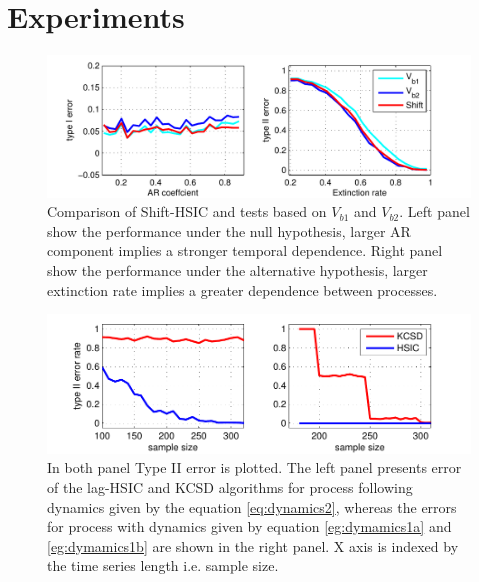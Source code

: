 \section{Experiments}
\label{sec:Experiments}




\begin{figure}
\centering  
\includegraphics[width=1\textwidth]{arExtinct.pdf}
\caption{Comparison of Shift-HSIC and tests based on $V_{b1}$ and $V_{b2}$. Left panel show the performance under the null hypothesis, larger AR component implies a stronger temporal dependence. Right panel show the performance under the alternative hypothesis, larger extinction rate implies a greater dependence between processes.}
\label{fig:arExtinct}
\end{figure}

\begin{figure}
\centering  
\includegraphics[width=1\textwidth]{varAndPhase.pdf}
\caption{In both panel Type II error is plotted. The left panel presents error of the lag-HSIC and KCSD algorithms for process following dynamics given by the equation \eqref{eq:dynamics2}, whereas the errors for process with dynamics given by equation \eqref{eg:dymamics1a} and \eqref{eg:dymamics1b} are shown in the right panel. X axis is indexed by the time series length i.e. sample size.}
\label{fig:phaseAndVar}
\end{figure}

\vspace{-0.2cm}
